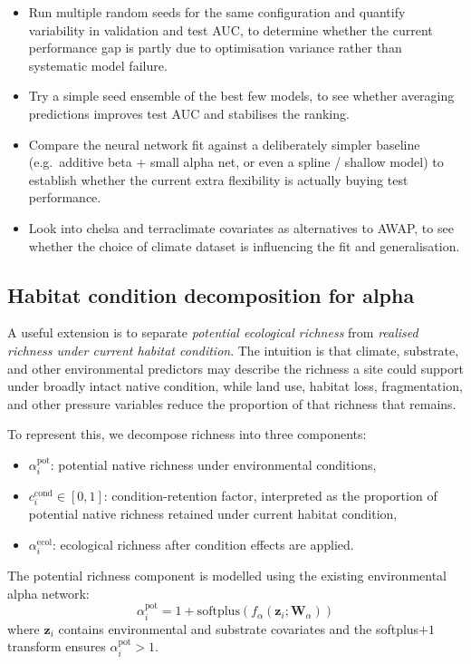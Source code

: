 \documentclass{article}
\begin{document}
\begin{itemize}
    \item Run multiple random seeds for the same configuration and quantify variability in validation and test AUC, to determine whether the current performance gap is partly due to optimisation variance rather than systematic model failure.
    \item Try a simple seed ensemble of the best few models, to see whether averaging predictions improves test AUC and stabilises the ranking.
    \item Compare the neural network fit against a deliberately simpler baseline (e.g.\ additive beta + small alpha net, or even a spline / shallow model) to establish whether the current extra flexibility is actually buying test performance.
    \item Look into chelsa and terraclimate covariates as alternatives to AWAP, to see whether the choice of climate dataset is influencing the fit and generalisation.
\end{itemize}


\subsection{Habitat condition decomposition for alpha}
\label{sec:condition-decomposition}

A useful extension is to separate \emph{potential ecological richness} from \emph{realised richness under current habitat condition}. The intuition is that climate, substrate, and other environmental predictors may describe the richness a site could support under broadly intact native condition, while land use, habitat loss, fragmentation, and other pressure variables reduce the proportion of that richness that remains.

To represent this, we decompose richness into three components:
\begin{itemize}
    \item \(\alpha_i^{\mathrm{pot}}\): potential native richness under environmental conditions,
    \item \(c_i^{\mathrm{cond}} \in [0,1]\): condition-retention factor, interpreted as the proportion of potential native richness retained under current habitat condition,
    \item \(\alpha_i^{\mathrm{ecol}}\): ecological richness after condition effects are applied.
\end{itemize}

The potential richness component is modelled using the existing environmental alpha network:
\begin{equation}
    \alpha_i^{\mathrm{pot}}
    =
    1 + \mathrm{softplus}\!\left(f_\alpha(\mathbf{z}_i;\bm{W}_\alpha)\right)
\end{equation}
where \(\mathbf{z}_i\) contains environmental and substrate covariates and the softplus\(+1\) transform ensures \(\alpha_i^{\mathrm{pot}} > 1\).
\end{document}
